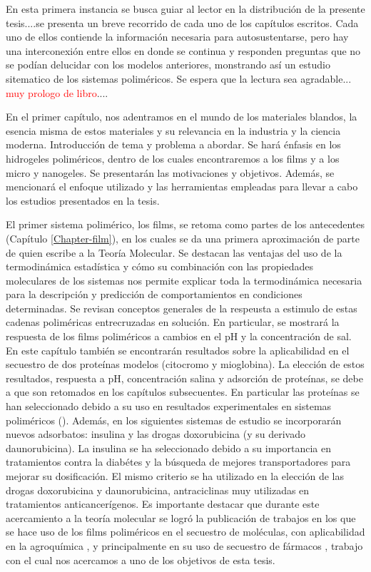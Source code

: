 \label{ruta}

 
En esta primera instancia se busca guiar al lector en la distribuci\'on de la presente tesis....se presenta un breve recorrido de cada uno de los cap\'itulos escritos.
Cada uno de ellos contiende la informaci\'on necesaria para autosustentarse, pero hay una interconexi\'on entre ellos en donde se continua y responden preguntas que no se pod\'ian delucidar con los modelos anteriores, monstrando as\'i un estudio sitematico de los sistemas polim\'ericos.
Se espera que la lectura sea agradable... \textcolor{red}{muy prologo de libro}....

En el primer cap\'itulo, nos adentramos en el mundo de los materiales blandos, la esencia misma de estos materiales y su relevancia en la industria y la ciencia moderna. Introducción de tema y problema a abordar.  Se har\'a \'enfasis en los hidrogeles polim\'ericos, dentro de los cuales encontraremos a los films y a los micro y nanogeles. Se presentar\'an las motivaciones y objetivos. Adem\'as, se mencionar\'a el enfoque utilizado y las herramientas empleadas para llevar a cabo los estudios presentados en la tesis.

El primer sistema polim\'erico, los films, se retoma como partes de los antecedentes (Cap\'itulo \ref{Chapter-film}), en los cuales se da una primera aproximaci\'on de parte de quien escribe a la Teor\'ia Molecular. Se destacan las ventajas del uso de la termodin\'amica estad\'istica y c\'omo su combinaci\'on con las propiedades moleculares de los sistemas nos permite explicar toda la termodin\'amica necesaria para la descripci\'on y predicci\'on de comportamientos en condiciones determinadas. Se revisan conceptos generales de la respeusta a estimulo de estas cadenas polim\'ericas entrecruzadas en soluci\'on. En particular, se mostrar\'a la respuesta de los films polim\'ericos a cambios en el pH y la concentraci\'on de sal. En este cap\'itulo tambi\'en se encontrar\'an resultados sobre la aplicabilidad en el secuestro de dos prote\'inas modelos (citocromo y mioglobina). La elecci\'on de estos resultados, respuesta a pH, concentraci\'on salina y adsorci\'on de prote\'inas, se debe a que son retomados en los cap\'itulos subsecuentes. En particular las prote\'inas se han seleccionado debido a su uso en resultados experimentales en sistemas polim\'ericos (\addcite). Adem\'as, en los siguientes sistemas de estudio se incorporar\'an nuevos adsorbatos: insulina y las drogas doxorubicina (y su derivado daunorubicina). La insulina se ha seleccionado debido a su importancia en tratamientos contra la diab\'etes y la b\'usqueda de mejores transportadores para mejorar su dosificaci\'on. El mismo criterio se ha utilizado en la elecci\'on de las drogas doxorubicina y daunorubicina, antraciclinas muy utilizadas en tratamientos anticancer\'igenos.
Es importante destacar que durante este acercamiento a la teor\'ia molecular se logr\'o la publicaci\'on de trabajos en los que se hace uso de los films polim\'ericos en el secuestro de mol\'eculas, con aplicabilidad en la agroqu\'imica \cite{perez2018using, perez2019molecular}, y principalmente en su uso de secuestro de f\'armacos \cite{perez2020triggering}, trabajo con el cual nos acercamos a uno de los objetivos de esta tesis. 

